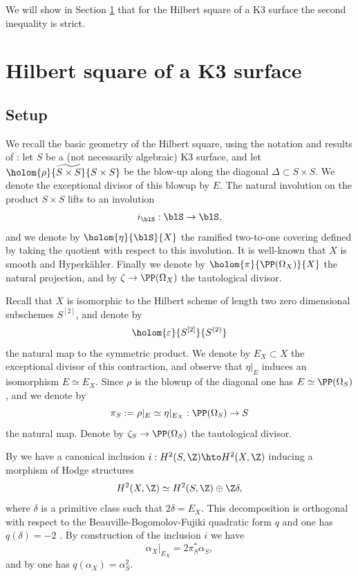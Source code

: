 We will show in Section \ref{sectionK3square} that for the Hilbert square of a K3 surface the second inequality is strict.

\section{Hilbert square of a K3 surface} \label{sectionK3square}

\subsection{Setup}
\label{subsectionsetup}

We recall the basic geometry of the Hilbert square, using the notation and results of \cite[\S 6]{Bea83}:
let $S$ be a (not necessarily algebraic) K3 surface, and let $\holom{\rho}{\widetilde{S \times S}}{S \times S}$ be the blow-up along the diagonal $\Delta \subset S \times S$. We denote the exceptional divisor of this blowup by $E$.
The natural involution on the product $S \times S$ lifts to an involution
\[
i_{\blS}: \blS \to \blS,
\]
and we denote by
$\holom{\eta}{\blS}{X}$ the ramified two-to-one covering defined by taking the quotient with respect to this involution.
It is well-known that $X$ is smooth and Hyperkähler.
Finally we denote by $\holom{\pi}{\PP(\Omega_X)}{X}$ the natural projection, and by $\zeta \to \PP(\Omega_X)$
the tautological divisor.

Recall that $X$ is isomorphic to the Hilbert scheme of length two zero dimensional subschemes $S^{[2]}$, and denote by
\[
\holom{\varepsilon}{S^{[2]}}{S^{(2)}}
\]
the natural map to the symmetric product. We denote by $E_X \subset X$ the exceptional
divisor of this contraction, and observe that $\eta|_E$ induces an isomorphism $E \simeq E_X$.
Since $\rho$ is the blowup of the diagonal one has
$E \simeq \PP(\Omega_S)$, and we denote by
\[
\pi_S:= \rho|_E \simeq \eta|_{E_X}: \PP(\Omega_S) \to S
\]
the natural map. Denote by $\zeta_S \to \PP(\Omega_S)$ the tautological divisor.

By \cite[\S 6, Prop.\,6]{Bea83} we have a canonical inclusion
$i: H^2(S, \Z) \hto H^2(X, \Z)$ inducing a morphism of Hodge structures
\[
H^2(X, \Z) \simeq H^2(S, \Z) \oplus \Z \delta,
\]
where $\delta$ is a primitive class such that $2 \delta = E_X$.
This decomposition is orthogonal with respect to the Beauville-Bogomolov-Fujiki quadratic form $q$ \cite[\S 9, Lem.\,1]{Bea83}
and one has $q(\delta)=-2$ \cite[\S 1, Rem.\,1]{Bea83}.
By construction of the inclusion $i$ \cite[\S 6, Prop.\,6]{Bea83}
we have
\begin{equation} \label{restrictalphaX}
\alpha_X|_{E_X} = 2 \pi_S^* \alpha_S,
\end{equation}
and by \cite[\S 9, Rem.\,1]{Bea83} one has $q(\alpha_X)=\alpha_S^2$.

